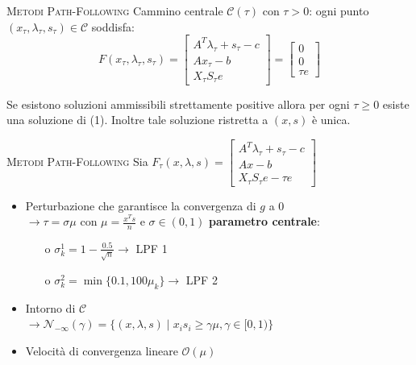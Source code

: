 \begin{frame}[t]{\textsc{\LARGE \textcolor{burntumber}{Metodi Path-Following}}}
	Cammino centrale $\mathcal{C}(\tau)$ con $\tau  > 0$: ogni punto $(x_{\tau}, \lambda_{\tau}, s_{\tau})\in \mathcal{C}$ soddisfa:
\begin{equation}\label{Ftao}\tag{1}
\mathit{F}(x_{\tau},\lambda_{\tau},s_{\tau})= \begin{bmatrix}
A^{T}\lambda_{\tau}+s_{\tau}-c \\Ax_{\tau}-b \\X_{\tau}S_{\tau}e
\end{bmatrix}=\begin{bmatrix}0\\0\\ \tau e \end{bmatrix}
\end{equation}
\begin{theorem}
	Se esistono soluzioni ammissibili strettamente positive allora per ogni $\tau\geq0$ esiste una soluzione di (1). Inoltre tale
	soluzione ristretta a $(x, s)$ è unica.
\end{theorem}
\end{frame}


\begin{frame}{\textsc{\LARGE \textcolor{burntumber}{Metodi Path-Following}}}
Sia   $\mathit{F}_{\tau}(x,\lambda,s)= \begin{bmatrix}
A^{T}\lambda_{\tau}+s_{\tau}-c \\Ax-b \\X_{\tau}S_{\tau}e-\tau e
\end{bmatrix}$
\\[1 cm]
\begin{itemize}
	\item Perturbazione che garantisce la convergenza di $g$ a $0$\\ $\rightarrow \tau = \sigma \mu$ 
con $\mu = \frac{x^{T}s}{n}$ e $\sigma \in(0,1)$ \textbf{parametro centrale}:
\pause
\begin{itemize}
	\item[o] $\sigma^{1}_{k} = 1 -\frac{0.5}{\sqrt{n}}\rightarrow$\textrm{ LPF 1}\pause
	\item[o] $\sigma^{2}_{k} = \min\{0.1, 100\mu_{k}\}\rightarrow$\textrm{ LPF 2}	
\end{itemize}
\pause
\item Intorno di $\mathcal{C}$\\ 
$\rightarrow \mathcal{N}_{-\infty}(\gamma) =\{ (x, \lambda,s)\;|\; x_{i}s_{i} \geq \gamma \mu,  \gamma \in [0,1)\}$
\pause
\item Velocità di convergenza lineare $\mathcal{O}(\mu)$
\end{itemize}
\end{frame}

